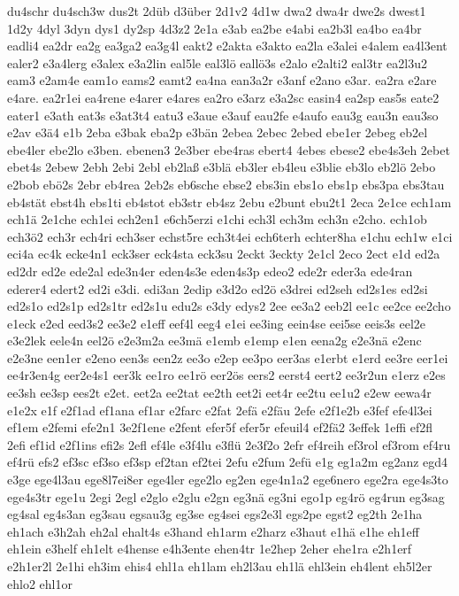 {du4schr
du4sch3w
dus2t
2düb
d3über
2d1v2
4d1w
dwa2
dwa4r
dwe2s
dwest1
1d2y
4dyl
3dyn
dys1
dy2sp
4d3z2
2e1a
e3ab
ea2be
e4abi
ea2b3l
ea4bo
ea4br
eadli4
ea2dr
ea2g
ea3ga2
ea3g4l
eakt2
e2akta
e3akto
ea2la
e3alei
e4alem
ea4l3ent
ealer2
e3a4lerg
e3alex
e3a2lin
eal5le
eal3lö
eallö3s
e2alo
e2alti2
eal3tr
ea2l3u2
eam3
e2am4e
eam1o
eams2
eamt2
ea4na
ean3a2r
e3anf
e2ano
e3ar.
ea2ra
e2are
e4are.
ea2r1ei
ea4rene
e4arer
e4ares
ea2ro
e3arz
e3a2sc
easin4
ea2sp
eas5s
eate2
eater1
e3ath
eat3s
e3at3t4
eatu3
e3aue
e3auf
eau2fe
e4aufo
eau3g
eau3n
eau3so
e2av
e3ä4
e1b
2eba
e3bak
eba2p
e3bän
2ebea
2ebec
2ebed
ebe1er
2ebeg
eb2el
ebe4ler
ebe2lo
e3ben.
ebenen3
2e3ber
ebe4ras
ebert4
4ebes
ebese2
ebe4s3eh
2ebet
ebet4s
2ebew
2ebh
2ebi
2ebl
eb2laß
e3blä
eb3ler
eb4leu
e3blie
eb3lo
eb2lö
2ebo
e2bob
ebö2s
2ebr
eb4rea
2eb2s
eb6sche
ebse2
ebs3in
ebs1o
ebs1p
ebs3pa
ebs3tau
eb4stät
ebst4h
ebs1ti
eb4stot
eb3str
eb4sz
2ebu
e2bunt
ebu2t1
2eca
2e1ce
ech1am
ech1ä
2e1che
ech1ei
ech2en1
e6ch5erzi
e1chi
ech3l
ech3m
ech3n
e2cho.
ech1ob
ech3ö2
ech3r
ech4ri
ech3ser
echst5re
ech3t4ei
ech6terh
echter8ha
e1chu
ech1w
e1ci
eci4a
ec4k
ecke4n1
eck3ser
eck4sta
eck3su
2eckt
3eckty
2e1cl
2eco
2ect
e1d
ed2a
ed2dr
ed2e
ede2al
ede3n4er
eden4s3e
eden4s3p
edeo2
ede2r
eder3a
ede4ran
ederer4
edert2
ed2i
e3di.
edi3an
2edip
e3d2o
ed2ö
e3drei
ed2seh
ed2s1es
ed2si
ed2s1o
ed2s1p
ed2s1tr
ed2s1u
edu2s
e3dy
edys2
2ee
ee3a2
eeb2l
ee1c
ee2ce
ee2cho
e1eck
e2ed
eed3s2
ee3e2
e1eff
eef4l
eeg4
e1ei
ee3ing
eein4se
eei5se
eeis3s
eel2e
e3e2lek
eele4n
eel2ö
e2e3m2a
ee3mä
e1emb
e1emp
e1en
eena2g
e2e3nä
e2enc
e2e3ne
een1er
e2eno
een3s
een2z
ee3o
e2ep
ee3po
eer3as
e1erbt
e1erd
ee3re
eer1ei
ee4r3en4g
eer2e4s1
eer3k
ee1ro
ee1rö
eer2ös
eers2
eerst4
eert2
ee3r2un
e1erz
e2es
ee3sh
ee3sp
ees2t
e2et.
eet2a
ee2tat
ee2th
eet2i
eet4r
ee2tu
ee1u2
e2ew
eewa4r
e1e2x
e1f
e2f1ad
ef1ana
ef1ar
e2farc
e2fat
2efä
e2fäu
2efe
e2f1e2b
e3fef
efe4l3ei
ef1em
e2femi
efe2n1
3e2f1ene
e2fent
efer5f
efer5r
efeuil4
ef2fä2
3effek
1effi
ef2fl
2efi
ef1id
e2f1ins
efi2s
2efl
ef4le
e3f4lu
e3flü
2e3f2o
2efr
ef4reih
ef3rol
ef3rom
ef4ru
ef4rü
efs2
ef3sc
ef3so
ef3sp
ef2tan
ef2tei
2efu
e2fum
2efü
e1g
eg1a2m
eg2anz
egd4
e3ge
ege4l3au
ege8l7ei8er
ege4ler
ege2lo
eg2en
ege4n1a2
ege6nero
ege2ra
ege4s3to
ege4s3tr
ege1u
2egi
2egl
e2glo
e2glu
e2gn
eg3nä
eg3ni
ego1p
eg4rö
eg4run
eg3sag
eg4sal
eg4s3an
eg3sau
egsau3g
eg3se
eg4sei
egs2e3l
egs2pe
egst2
eg2th
2e1ha
eh1ach
e3h2ah
eh2al
ehalt4s
e3hand
eh1arm
e2harz
e3haut
e1hä
e1he
eh1eff
eh1ein
e3helf
eh1elt
e4hense
e4h3ente
ehen4tr
1e2hep
2eher
ehe1ra
e2h1erf
e2h1er2l
2e1hi
eh3im
ehis4
ehl1a
eh1lam
eh2l3au
eh1lä
ehl3ein
eh4lent
eh5l2er
ehlo2
ehl1or
}
